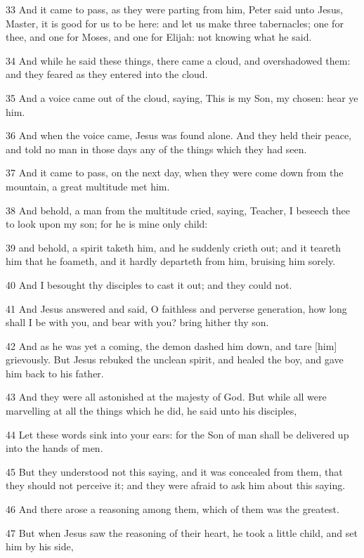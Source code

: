 \par 33 And it came to pass, as they were parting from him, Peter said unto Jesus, Master, it is good for us to be here: and let us make three tabernacles; one for thee, and one for Moses, and one for Elijah: not knowing what he said.
\par 34 And while he said these things, there came a cloud, and overshadowed them: and they feared as they entered into the cloud.
\par 35 And a voice came out of the cloud, saying, This is my Son, my chosen: hear ye him.
\par 36 And when the voice came, Jesus was found alone. And they held their peace, and told no man in those days any of the things which they had seen.
\par 37 And it came to pass, on the next day, when they were come down from the mountain, a great multitude met him.
\par 38 And behold, a man from the multitude cried, saying, Teacher, I beseech thee to look upon my son; for he is mine only child:
\par 39 and behold, a spirit taketh him, and he suddenly crieth out; and it teareth him that he foameth, and it hardly departeth from him, bruising him sorely.
\par 40 And I besought thy disciples to cast it out; and they could not.
\par 41 And Jesus answered and said, O faithless and perverse generation, how long shall I be with you, and bear with you? bring hither thy son.
\par 42 And as he was yet a coming, the demon dashed him down, and tare [him] grievously. But Jesus rebuked the unclean spirit, and healed the boy, and gave him back to his father.
\par 43 And they were all astonished at the majesty of God. But while all were marvelling at all the things which he did, he said unto his disciples,
\par 44 Let these words sink into your ears: for the Son of man shall be delivered up into the hands of men.
\par 45 But they understood not this saying, and it was concealed from them, that they should not perceive it; and they were afraid to ask him about this saying.
\par 46 And there arose a reasoning among them, which of them was the greatest.
\par 47 But when Jesus saw the reasoning of their heart, he took a little child, and set him by his side,
